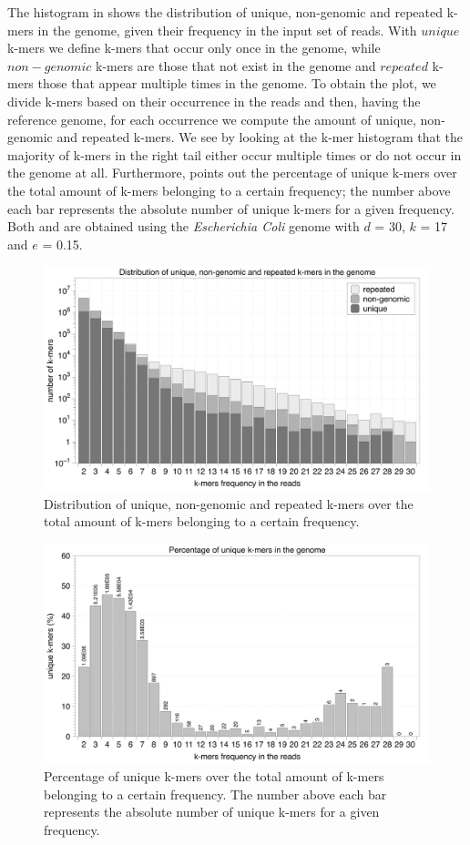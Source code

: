 \documentclass[11pt]{article}
\begin{document}
The histogram in  shows the distribution of unique, non-genomic and repeated k-mers in the genome, given their frequency in the input set of reads.
With $unique$ k-mers we define k-mers that occur only once in the genome, while $non-genomic$ k-mers are those that not exist in the genome and $repeated$ k-mers those that appear multiple times in the genome. 
To obtain the plot, we divide k-mers based on their occurrence in the reads and then, having the reference genome, for each occurrence we compute the amount of unique, non-genomic and repeated k-mers.
We see by looking at the k-mer histogram that the majority of k-mers in the right tail either occur multiple times or do not occur in the genome at all.
Furthermore,  points out the percentage of unique k-mers over the total amount of k-mers belonging to a certain frequency; the number above each bar represents the absolute number of unique k-mers for a given frequency.
Both  and  are obtained using the \emph{Escherichia Coli} genome with $d$ = 30, $k$ = 17 and $e$ = 0.15.
\begin{figure}
    \centering
    \includegraphics[width=\textwidth]{image/kmerdistribution.pdf}
    \caption{Distribution of unique, non-genomic and repeated k-mers over the total amount of k-mers belonging to a certain frequency.}
    \label{fig:hist}
\end{figure}
\begin{figure}
    \centering
    \includegraphics[width=\textwidth]{image/unique.pdf}
    \caption{Percentage of unique k-mers over the total amount of k-mers belonging to a certain frequency. The number above each bar represents the absolute number of unique k-mers for a given frequency.}
    \label{fig:unique}
\end{figure}
\end{document}
